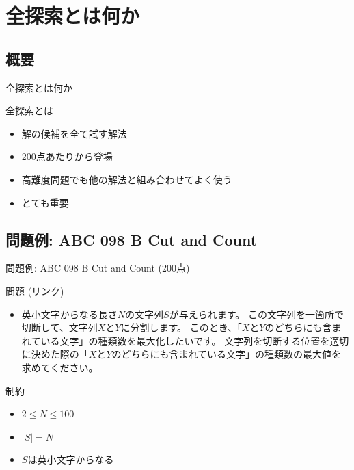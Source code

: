 \documentclass[dvipdfmx]{beamer}
\begin{document}
\section{全探索とは何か}

\subsection{概要}

\begin{frame}{全探索とは何か}
  \begin{block}{全探索とは}
    \begin{itemize}
      \item 解の候補を全て試す解法
      \item 200点あたりから登場
      \item 高難度問題でも他の解法と組み合わせてよく使う
      \item とても重要
    \end{itemize}
  \end{block}
\end{frame}

\subsection{問題例: ABC 098 B Cut and Count}

\begin{frame}{問題例: ABC 098 B Cut and Count (200点)}
  \begin{block}{問題 (\href{https://beta.atcoder.jp/contests/abc098/tasks/abc098_b}{リンク})}
    \begin{itemize}
      \item 英小文字からなる長さ$N$の文字列$S$が与えられます。
      この文字列を一箇所で切断して、文字列$X$と$Y$に分割します。
      このとき、「$X$と$Y$のどちらにも含まれている文字」の種類数を最大化したいです。
      文字列を切断する位置を適切に決めた際の「$X$と$Y$のどちらにも含まれている文字」の種類数の最大値を求めてください。
    \end{itemize}
  \end{block}
  \begin{block}{制約}
    \begin{itemize}
      \item $2 \le N \le 100$
      \item $|S|=N$
      \item $S$は英小文字からなる
    \end{itemize}
  \end{block}
\end{frame}
\end{document}
